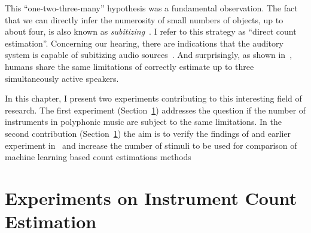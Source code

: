 This ``one-two-three-many'' hypothesis was a fundamental observation. 
The fact that we can directly infer the numerosity of small numbers of objects, up to about four, is also known as \emph{subitizing}~\cite{kaufman49, burr10}.
I refer to this strategy as ``direct count estimation''.
Concerning our hearing, there are indications that the auditory system is capable of subitizing audio sources~\cite{hoopen79}.
And surprisingly, as shown in~\cite{kashino96, kawashima15}, humans share the same limitations of correctly estimate up to three simultaneously active speakers.
\par
In this chapter, I present two experiments contributing to this interesting field of research.
The first experiment (Section~\ref{sec:ismir}) addresses the question if the number of instruments in polyphonic music are subject to the same limitations.
In the second contribution (Section~\ref{sec:ismir}) the aim is to verify the findings of and earlier experiment in~\cite{kawashima15} and increase the number of stimuli to be used for comparison of machine learning based count estimations methods

\section{Experiments on Instrument Count Estimation}%
\label{sec:ismir}


